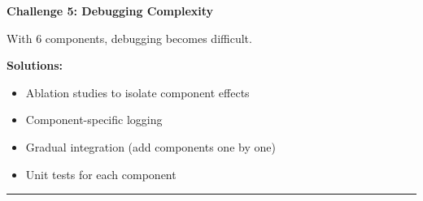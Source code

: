 \documentclass[12pt]{article}
\begin{document}
{{\textbf{Challenge 5: Debugging Complexity}

With 6 components, debugging becomes difficult.

\textbf{Solutions:}
\begin{itemize}
\item Ablation studies to isolate component effects
\item Component-specific logging
\item Gradual integration (add components one by one)
\item Unit tests for each component
\end{itemize}

\noindent\rule{\textwidth}{0.2pt}
}}


\newpage
\end{document}
